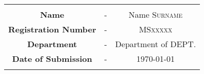 
\begin{tabular}{|c c c|}
    \hline
    & &\\
    





   
    \large{\textbf{Name }} & - &%
    \large{Name \textsc{Surname}}\\ %
    
    
    \large{\textbf{Registration Number}} & - &%
    \large{\textsc{MSxxxxx}}\\ %
    
    
    \large{\textbf{Department}} & - &%
    \large{Department of \textsc{DEPT.}}\\ %
    
    
    \large{\textbf{Date of Submission}} & - &%
    \large{\today}\\ %
    







    & &\\
    \hline
\end{tabular}

